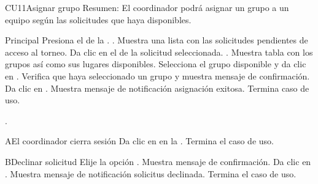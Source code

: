 
	\begin{UseCase}{CU11}{Asignar grupo}{
		Resumen: El coordinador podrá asignar un grupo a un equipo según las solicitudes que haya disponibles. }
	\end{UseCase}
	\newpage
	\begin{UCtrayectoria}{Principal}
	\UCpaso[\UCactor] Presiona el  de la  .	.
	\UCpaso Muestra una lista con las solicitudes pendientes de acceso al torneo.
	\UCpaso[\UCactor] Da clic en el  de la solicitud seleccionada. .
	\UCpaso Muestra tabla con los grupos así como sus lugares disponibles.
	\UCpaso[\UCactor] Selecciona el grupo disponible y da clic en  .
	\UCpaso Verifica que haya seleccionado un grupo y muestra mensaje de confirmación. 
	\UCpaso[\UCactor] Da clic en  .
	\UCpaso Muestra mensaje de notificación asignación exitosa. 
	\UCpaso Termina caso de uso. 
	
	.
\end{UCtrayectoria}

	\begin{UCtrayectoriaA}{A}{El coordinador cierra sesión}
		\UCpaso[\UCactor] Da clic en   en la .
		\UCpaso Termina el caso de uso.
	\end{UCtrayectoriaA}

	\begin{UCtrayectoriaA}{B}{Declinar solicitud}
		\UCpaso[\UCactor] Elije la opción .
		\UCpaso Muestra mensaje de confirmación. 
		\UCpaso[\UCactor] Da clic en  .
		\UCpaso Muestra mensaje de notificación solicitus declinada. 
		\UCpaso Termina el caso de uso.
	\end{UCtrayectoriaA}
	
